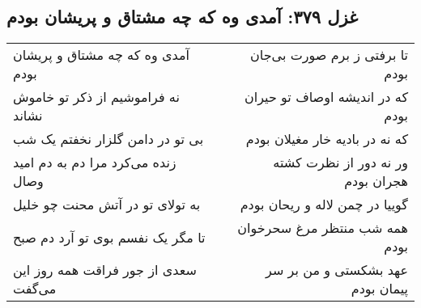 \begin{center}
\section*{غزل ۳۷۹: آمدی وه که چه مشتاق و پریشان بودم}
\label{sec:379}
\begin{longtable}{l p{0.5cm} r}
آمدی وه که چه مشتاق و پریشان بودم
&&
تا برفتی ز برم صورت بی‌جان بودم
\\
نه فراموشیم از ذکر تو خاموش نشاند
&&
که در اندیشه اوصاف تو حیران بودم
\\
بی تو در دامن گلزار نخفتم یک شب
&&
که نه در بادیه خار مغیلان بودم
\\
زنده می‌کرد مرا دم به دم امید وصال
&&
ور نه دور از نظرت کشته هجران بودم
\\
به تولای تو در آتش محنت چو خلیل
&&
گوییا در چمن لاله و ریحان بودم
\\
تا مگر یک نفسم بوی تو آرد دم صبح
&&
همه شب منتظر مرغ سحرخوان بودم
\\
سعدی از جور فراقت همه روز این می‌گفت
&&
عهد بشکستی و من بر سر پیمان بودم
\\
\end{longtable}
\end{center}
